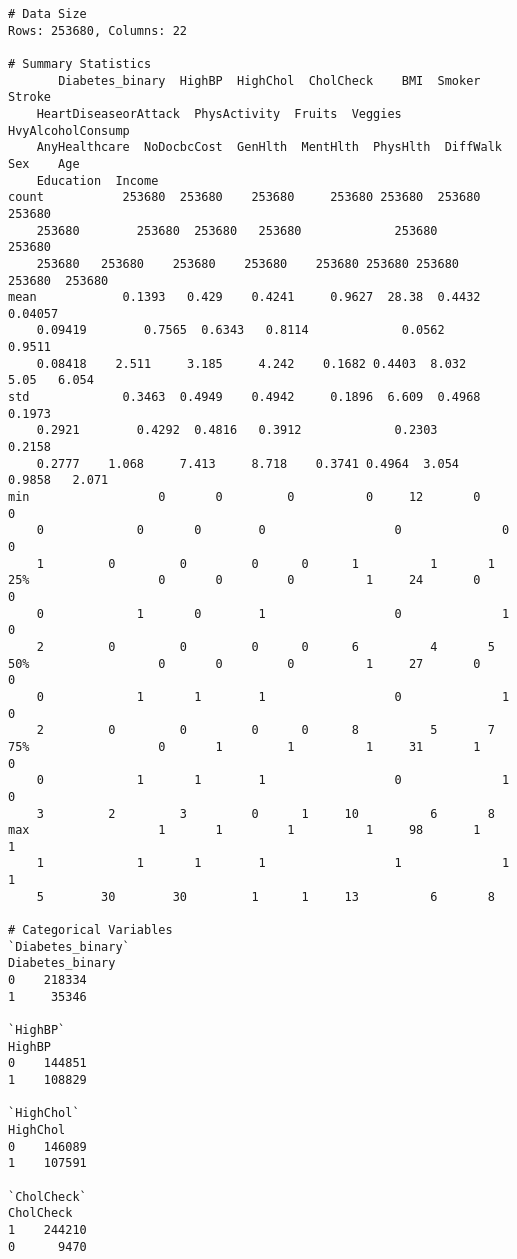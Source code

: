 \documentclass[11pt]{article}
\begin{document}
\begin{Verbatim}[tabsize=4]
# Data Size
Rows: 253680, Columns: 22

# Summary Statistics
       Diabetes_binary  HighBP  HighChol  CholCheck    BMI  Smoker  Stroke
	HeartDiseaseorAttack  PhysActivity  Fruits  Veggies  HvyAlcoholConsump
	AnyHealthcare  NoDocbcCost  GenHlth  MentHlth  PhysHlth  DiffWalk    Sex    Age
	Education  Income
count           253680  253680    253680     253680 253680  253680  253680
	253680        253680  253680   253680             253680         253680
	253680   253680    253680    253680    253680 253680 253680     253680  253680
mean            0.1393   0.429    0.4241     0.9627  28.38  0.4432 0.04057
	0.09419        0.7565  0.6343   0.8114             0.0562         0.9511
	0.08418    2.511     3.185     4.242    0.1682 0.4403  8.032       5.05   6.054
std             0.3463  0.4949    0.4942     0.1896  6.609  0.4968  0.1973
	0.2921        0.4292  0.4816   0.3912             0.2303         0.2158
	0.2777    1.068     7.413     8.718    0.3741 0.4964  3.054     0.9858   2.071
min                  0       0         0          0     12       0       0
	0             0       0        0                  0              0            0
	1         0         0         0      0      1          1       1
25%                  0       0         0          1     24       0       0
	0             1       0        1                  0              1            0
	2         0         0         0      0      6          4       5
50%                  0       0         0          1     27       0       0
	0             1       1        1                  0              1            0
	2         0         0         0      0      8          5       7
75%                  0       1         1          1     31       1       0
	0             1       1        1                  0              1            0
	3         2         3         0      1     10          6       8
max                  1       1         1          1     98       1       1
	1             1       1        1                  1              1            1
	5        30        30         1      1     13          6       8

# Categorical Variables
`Diabetes_binary`
Diabetes_binary
0    218334
1     35346

`HighBP`
HighBP
0    144851
1    108829

`HighChol`
HighChol
0    146089
1    107591

`CholCheck`
CholCheck
1    244210
0      9470


\end{Verbatim}
\end{document}
